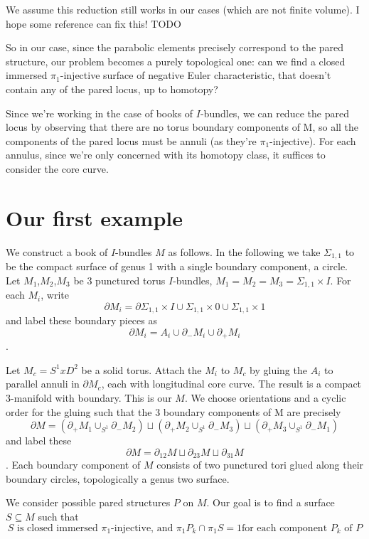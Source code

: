 \documentclass[12pt]{amsart}
\theoremstyle{definition}
\theoremstyle{remark}
\newcommand{\x}{\times}
\newcommand{\bd}{\partial}
\newcommand{\Si}{\Sigma}
\newcommand{\cin}{\subseteq}
\begin{document}
We assume this reduction still works in our cases (which are not finite
volume). I hope some reference can fix this! TODO

So in our case, since the parabolic elements precisely correspond to the pared
structure, our problem becomes a purely topological one: can we find a closed
immersed $\pi_1$-injective surface of negative Euler characteristic, that
doesn't contain any of the pared locus, up to homotopy?

Since we're working in the case of books of $I$-bundles, we can reduce the
pared locus by observing that there are no torus boundary components of M, so
all the components of the pared locus must be annuli (as they're
$\pi_1$-injective). For each annulus, since we're only concerned with its
homotopy class, it suffices to consider the core curve.

\section{Our first example}

We construct a book of $I$-bundles $M$ as follows. In the following we take
$\Si_{1,1}$ to be the compact surface of genus 1 with a single boundary
component, a circle. Let $M_1$,$M_2$,$M_3$ be 3 punctured torus $I$-bundles,
$M_1=M_2=M_3=\Si_{1,1}\x I$. For each $M_i$, write \[ \bd M_i = \bd \Si_{1,1}\x
I \cup \Si_{1,1}\x0 \cup \Si_{1,1} \x 1 \] and label these boundary pieces as
\[ \bd M_i = A_i \cup \bd_- M_i \cup \bd_+M_i \].

Let $M_c = S^1xD^2$ be a solid torus. Attach the $M_i$ to $M_c$ by gluing the
$A_i$ to parallel annuli in $\bd M_c$, each with longitudinal core curve. The
result is a compact 3-manifold with boundary. This is our $M$. We choose
orientations and a cyclic order for the gluing such that the 3 boundary
components of M are precisely
\[
\bd M = (\bd_+M_1 \cup_{S^1} \bd_-M_2) \sqcup (\bd_+M_2 \cup_{S^1} \bd_-M_3)
\sqcup (\bd_+M_3 \cup_{S^1} \bd_-M_1)
\]
and label these
\[
\bd M=\bd_{12}M \sqcup \bd_{23}M \sqcup \bd_{31}M
\].
Each boundary
component of $M$ consists of two punctured tori glued along their boundary
circles, topologically a genus two surface.

We consider possible pared structures $P$ on $M$. Our goal is to find
a surface $S \cin M$ such that
\begin{equation}\label{E:qf}
S \text{ is closed immersed $\pi_1$-injective, and  $\pi_1P_k \cap \pi_1S
= 1$
for each component $P_k$ of $P$} \tag{\textasteriskcentered}
\end{equation}
\end{document}
